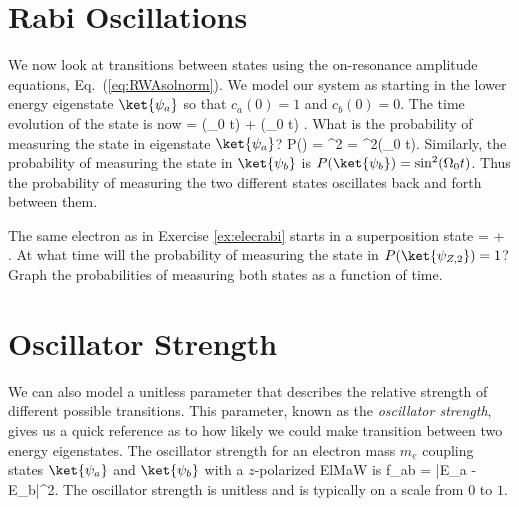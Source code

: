 \section{Rabi Oscillations}
We now look at transitions between states using the on-resonance amplitude equations, Eq.~(\ref{eq:RWAsolnorm}). We model our system as starting in the lower energy eigenstate $\ket{\psi_a}$ so that $c_a(0) =1$ and $c_b(0)=0$. The time evolution of the state is now
\beq
{} = \cos(\Omega_0 t)  + \I\sin(\Omega_0 t) .
\eeq
What is the probability of measuring the state in eigenstate $\ket{\psi_a}$? \marginnote[1cm]{\ref{tool:prob}}%
\beq
P() = ^2 = \cos^2(\Omega_0 t).
\eeq
Similarly, the probability of measuring the state in $\ket{\psi_b}$ is $P(\ket{\psi_b}) = \sin^2(\Omega_0 t)$. Thus the probability of measuring the two different states oscillates back and forth between them.
\begin{marginfigure}
\end{marginfigure}

\begin{exercise}
The same electron as in Exercise \ref{ex:elecrabi} starts in a superposition state
\beq
{} =   +  .
\eeq
At what time will the probability of measuring the state in $P(\ket{\psi_{Z,2}}) =1 $? Graph the probabilities of measuring both states as a function of time.
\end{exercise}

\section{Oscillator Strength}

We can also model a unitless parameter that describes the relative strength of different possible transitions. This parameter, known as the {\em oscillator strength}, gives us a quick reference as to how likely we could make transition between two energy eigenstates. The oscillator strength for an electron mass $m_e$ coupling states $\ket{\psi_a}$ and $\ket{\psi_b}$ with a $z$-polarized ElMaW is
\beq
f_{ab} =  \left|E_a - E_b\right|^2.
\label{eq:oscstr}
\eeq
The oscillator strength is unitless and is typically on a scale from $0$ to $1$. 

